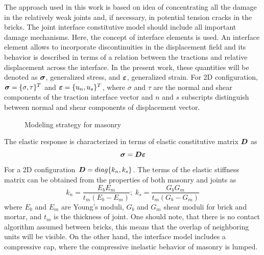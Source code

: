 \documentclass[epsf,a4paper]{article}
\newcommand{\mbf}[1]{\mbox{\boldmath$#1$}}
\newcommand{\del}[2]{\mbox{$\displaystyle\frac{#1}{#2}$}}
\newcommand{\e}{\mbf{\varepsilon}}
\newcommand{\sig}{\mbf{\sigma}}
\begin{document}
The approach used in this work is based on idea of concentrating all the damage in the relatively weak joints and, if necessary, in potential tension cracks in the bricks. The joint interface constitutive model should include all important damage mechanisms. Here, the  concept of interface elements is used. An interface element allows to incorporate discontinuities in the displacement field and its behavior is described in terms of a relation between the tractions and relative displacement across the interface. In the present work, these quantities will be denoted as $\sig$, generalized stress, and $\e$, generalized strain. For 2D configuration, $\sig=\{\sigma, \tau\}^T$ and $\e=\{u_n, u_s\}^T$, where $\sigma$ and $\tau$ are the normal and shear components of the traction interface vector and  $n$ and $s$ subscripts distinguish between normal and shear components of displacement vector.
\begin{figure}
  \centerline{}
  \caption{Modeling strategy for masonry}
\end{figure}
The elastic response is characterized in terms of elastic constitutive matrix $\mbf{D}$ as
\begin{equation}
  \sig=\mbf{D}\e
\end{equation}
For a 2D configuration $\mbf{D}=diag\{k_n,k_s\}$. The terms of the elastic stiffness matrix can be obtained from the properties of both masonry and joints as
\begin{equation}
  k_n=\del{E_bE_m}{t_m(E_b-E_m)};\;k_s=\del{G_bG_m}{t_m(G_b-G_m)}
\end{equation}
where $E_b$ and $E_m$ are Young's moduli, $G_b$ and $G_m$ shear moduli for brick and mortar, and $t_m$ is the thickness of joint. One should note, that there is no contact algorithm assumed between bricks, this means that the overlap of neighboring units will be visible. On the other hand, the interface model includes a compressive cap, where the compressive inelastic behavior of masonry is lumped.
\end{document}
